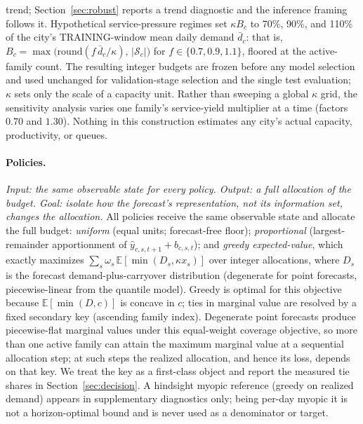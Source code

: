 trend; Section~\ref{sec:robust} reports a trend diagnostic and the inference framing
follows it.
Hypothetical service-pressure regimes set $\kappa B_c$ to 70\%, 90\%, and
110\% of the city's TRAINING-window mean daily demand $\bar d_c$: that is,
$B_c=\max\!\big(\mathrm{round}(f\,\bar d_c/\kappa),\,|\mathcal S_c|\big)$
for $f\in\{0.7,0.9,1.1\}$, floored at the active-family count. The
resulting integer budgets are frozen before any model selection and used
unchanged for validation-stage selection and the single test evaluation;
$\kappa$ sets only the scale of a capacity unit. Rather than sweeping a
global $\kappa$ grid, the sensitivity analysis varies one family's
service-yield multiplier at a time (factors $0.70$ and $1.30$). Nothing in
this construction estimates any city's actual capacity, productivity, or
queues.

\paragraph{Policies.}
\emph{Input: the same observable state for every policy. Output: a full
allocation of the budget. Goal: isolate how the forecast's
representation, not its information set, changes the allocation.}
All policies receive the same observable state and allocate the full
budget: \emph{uniform} (equal units; forecast-free floor);
\emph{proportional} (largest-remainder apportionment of
$\hat{y}_{c,s,t+1} + b_{c,s,t}$); and \emph{greedy expected-value}, which
exactly maximizes $\sum_s \omega_s\, \mathbb{E}[\min(D_s, \kappa x_s)]$
over integer allocations, where $D_s$ is the forecast
demand-plus-carryover distribution (degenerate for point forecasts,
piecewise-linear from the quantile model). Greedy is optimal for this
objective because $\mathbb{E}[\min(D, c)]$ is concave in $c$; ties in
marginal value are resolved by a fixed secondary key (ascending family
index). Degenerate point forecasts produce piecewise-flat marginal
values under this equal-weight coverage objective, so more than one
active family can attain the maximum marginal value at a sequential
allocation step; at such steps the realized allocation, and hence its
loss, depends on that key. We treat the key as a first-class object and
report the measured tie shares in Section~\ref{sec:decision}. A
hindsight myopic reference (greedy on realized demand) appears in
supplementary diagnostics only; being per-day myopic it is not a
horizon-optimal bound and is never used as a denominator or target.


